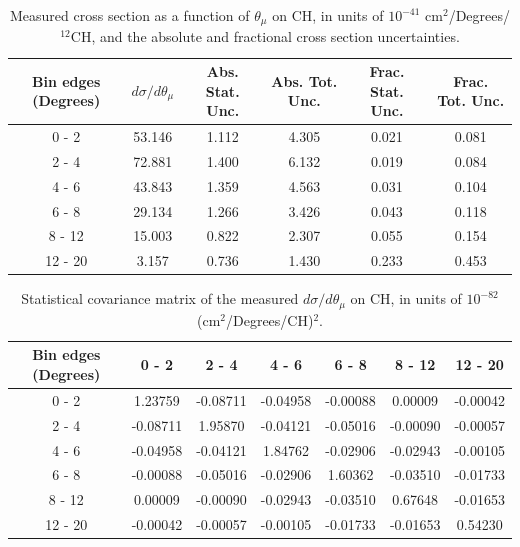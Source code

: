 \documentclass[aps,prl,twocolumn,superscriptaddress,nofootinbib]{revtex4-1}
\begin{document}
\begin{table}[h!]
  \centering
  \caption{Measured cross section as a function of $\theta_{\mu}$ on CH, in units of
  $10^{-41}$ $\text{cm}^{2}$/Degrees/$^{12}$CH, and the absolute and
  fractional cross section uncertainties.}
    \begin{tabular}{c||c||c|c||c|c}
      Bin edges (Degrees)  &  $d\sigma/d\theta_{\mu}$  &  Abs. Stat. Unc. & Abs. Tot. Unc.  &  Frac. Stat. Unc.  &  Frac. Tot. Unc. \\
      \hline\hline
        0 - 2 & 53.146 & 1.112 & 4.305 & 0.021 & 0.081 \\
        2 - 4 & 72.881 & 1.400 & 6.132 & 0.019 & 0.084 \\
        4 - 6 & 43.843 & 1.359 & 4.563 & 0.031 & 0.104 \\
        6 - 8 & 29.134 & 1.266 & 3.426 & 0.043 & 0.118 \\
       8 - 12 & 15.003 & 0.822 & 2.307 & 0.055 & 0.154 \\
      12 - 20 & 3.157 & 0.736 & 1.430 & 0.233 & 0.453 \\
    \end{tabular}
  \label{table:ThetaMuXSec_CH}
\end{table}

\begin{table}[h!]
  \centering
  \caption{Statistical covariance matrix of the measured $d\sigma/d\theta_{\mu}$ on CH, in units of $10^{-82}$ (cm$^{2}$/Degrees/CH)$^{2}$.}
    \begin{tabular}{c||cccccc}
      Bin edges (Degrees) & 0 - 2 & 2 - 4 & 4 - 6 & 6 - 8 & 8 - 12 & 12 - 20 \\
\hline \hline
        0 - 2 &  1.23759 & -0.08711 & -0.04958 & -0.00088 &  0.00009 & -0.00042 \\
        2 - 4 & -0.08711 &  1.95870 & -0.04121 & -0.05016 & -0.00090 & -0.00057 \\
        4 - 6 & -0.04958 & -0.04121 &  1.84762 & -0.02906 & -0.02943 & -0.00105 \\
        6 - 8 & -0.00088 & -0.05016 & -0.02906 &  1.60362 & -0.03510 & -0.01733 \\
       8 - 12 &  0.00009 & -0.00090 & -0.02943 & -0.03510 &  0.67648 & -0.01653 \\
      12 - 20 & -0.00042 & -0.00057 & -0.00105 & -0.01733 & -0.01653 &  0.54230 \\
    \end{tabular}
  \label{tablecov:CH_Statistical_ThetaMu}
\end{table}
\end{document}
